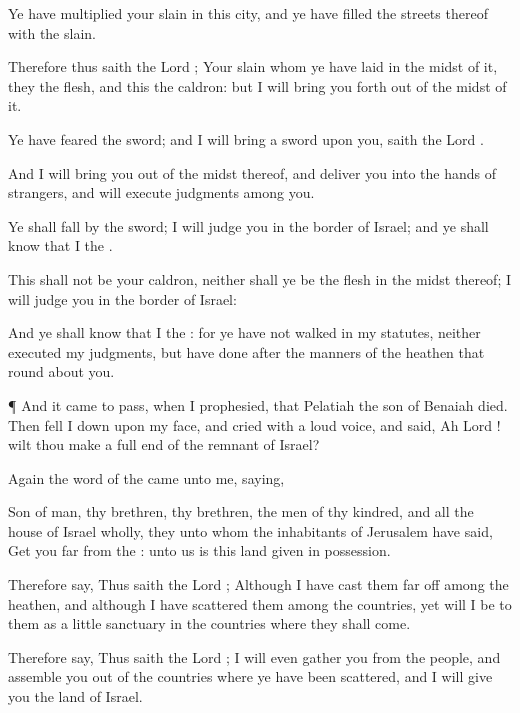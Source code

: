 {Ye have
multiplied your
slain in this
city, and ye have
filled the
streets thereof with the
slain.

Therefore thus
saith the
Lord
{}; Your
slain whom ye have
laid in the
midst of it, they
{} the
flesh, and this
{} the
caldron: but I will bring you
forth out of the
midst of it.

Ye have
feared the
sword; and I will
bring a
sword upon you,
saith the
Lord
{}.

And I will bring you
out of the
midst thereof, and
deliver you into the
hands of
strangers, and will
execute
judgments among you.

Ye shall
fall by the
sword; I will
judge you in the
border of
Israel; and ye shall
know that I
{} the
{}.

This
{} shall not be your
caldron, neither shall ye be the
flesh in the
midst thereof;
{} I will
judge you in the
border of
Israel:

And ye shall
know that I
{} the
{}: for ye have not
walked in my
statutes, neither
executed my
judgments, but have
done after the
manners of the
heathen that
{} round
about you.


\par }{\PP {}¶ And it came to pass, when I
prophesied, that
Pelatiah the
son of
Benaiah
died. Then fell I
down upon my
face, and
cried with a
loud
voice, and
said,
Ah
Lord
{}! wilt thou
make a full
end of the
remnant of
Israel?


\par }{\PP {}Again the
word of the
{} came unto me,
saying,

Son of
man, thy
brethren,
{} thy
brethren, the
men of thy
kindred, and all the
house of
Israel wholly,
{} they unto whom the
inhabitants of
Jerusalem have
said, Get you
far from the
{}: unto us is this
land
given in
possession.

Therefore
say, Thus
saith the
Lord
{}; Although I have cast them far
off among the
heathen, and although I have
scattered them among the
countries, yet will I be to them as a
little
sanctuary in the
countries where they shall
come.

Therefore
say, Thus
saith the
Lord
{}; I will even
gather you from the
people, and
assemble you out of the
countries where ye have been
scattered, and I will
give you the
land of
Israel.

}
